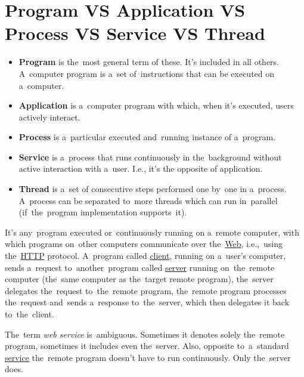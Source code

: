 \section*{\fontsize{17}{17} \selectfont Program VS Application VS Process VS Service VS Thread}
\label{applicationprocessprogramservicethread}
\begin{itemize}
    \item \textbf{Program} is the~most general term of these. It's included in all others. A~computer program is a~set of~instructions that can be executed on a~computer.
    \item \textbf{Application} is a~computer program with which, when it's executed, users actively interact.
    \item \textbf{Process} is a~particular executed and~running instance of a~program.
    \item \textbf{Service} is a~process that runs continuously in the~background without active interaction with a~user. I.e., it's the opposite of application.
    \item \textbf{Thread} is a~set of consecutive steps performed one by~one in a~process. A~process can be separated to~more threads which can run in~parallel (if~the~program implementation supports~it).
\end{itemize}

\label{webservice}
It's any~program executed or~continuously running on a~remote computer, with which programs on~other computers communicate over the~\hyperref[internetweb]{Web}, i.e.,~using the~\hyperref[http]{HTTP} protocol. A~program called \hyperref[clientserverarchitecture]{client}, running on a~user's computer, sends a~request to~another~program called \hyperref[clientserverarchitecture]{server} running on~the~remote computer (the~same computer as the~target remote program), the~server delegates the~request to~the~remote program, the~remote program processes the~request and~sends a~response to~the~server, which then delegates it back to~the~client.

\warning The~term \textit{web service} is~ambiguous. Sometimes it denotes solely the~remote program, sometimes it includes even the~server. Also, opposite to~a~standard \hyperref[applicationprocessprogramservicethread]{service} the~remote program doesn't have to run continuously. Only the~server does.

